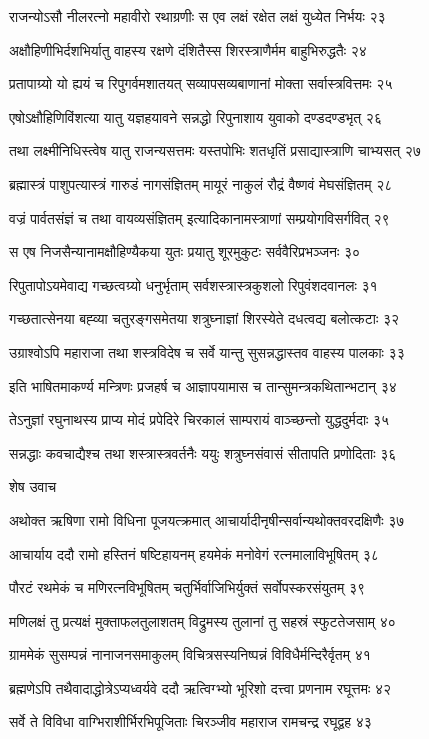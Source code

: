 राजन्योऽसौ नीलरत्नो महावीरो रथाग्रणीः
स एव लक्षं रक्षेत लक्षं युध्येत निर्भयः २३

अक्षौहिणीभिर्दशभिर्यातु वाहस्य रक्षणे
दंशितैस्स शिरस्त्राणैर्मम बाहुभिरुद्धतैः २४

प्रतापाग्र्यो यो ह्ययं च रिपुगर्वमशातयत्
सव्यापसव्यबाणानां मोक्ता सर्वास्त्रवित्तमः २५

एषोऽक्षौहिणिविंशत्या यातु यज्ञहयावने
सन्नद्धो रिपुनाशाय युवाको दण्डदण्डभृत् २६

तथा लक्ष्मीनिधिस्त्वेष यातु राजन्यसत्तमः
यस्तपोभिः शतधृतिं प्रसाद्यास्त्राणि चाभ्यसत् २७

ब्रह्मास्त्रं पाशुपत्यास्त्रं गारुडं नागसंज्ञितम्
मायूरं नाकुलं रौद्रं वैष्णवं मेघसंज्ञितम् २८

वज्रं पार्वतसंज्ञं च तथा वायव्यसंज्ञितम्
इत्यादिकानामस्त्राणां सम्प्रयोगविसर्गवित् २९

स एष निजसैन्यानामक्षौहिण्यैकया युतः
प्रयातु शूरमुकुटः सर्ववैरिप्रभञ्जनः ३०

रिपुतापोऽयमेवाद्य गच्छत्वग्र्यो धनुर्भृताम्
सर्वशस्त्रास्त्रकुशलो रिपुवंशदवानलः ३१

गच्छतात्सेनया बह्व्या चतुरङ्गसमेतया
शत्रुघ्नाज्ञां शिरस्येते दधत्वद्य बलोत्कटाः ३२

उग्राश्वोऽपि महाराजा तथा शस्त्रविदेष च
सर्वे यान्तु सुसन्नद्धास्तव वाहस्य पालकाः ३३

इति भाषितमाकर्ण्य मन्त्रिणः प्रजहर्ष च
आज्ञापयामास च तान्सुमन्त्रकथितान्भटान् ३४

तेऽनुज्ञां रघुनाथस्य प्राप्य मोदं प्रपेदिरे
चिरकालं साम्परायं वाञ्च्छन्तो युद्धदुर्मदाः ३५

सन्नद्धाः कवचाद्यैश्च तथा शस्त्रास्त्रवर्तनैः
ययुः शत्रुघ्नसंवासं सीतापति प्रणोदिताः ३६

शेष उवाच

अथोक्त ऋषिणा रामो विधिना पूजयत्क्रमात्
आचार्यादीनृषीन्सर्वान्यथोक्तवरदक्षिणैः ३७

आचार्याय ददौ रामो हस्तिनं षष्टिहायनम्
हयमेकं मनोवेगं रत्नमालाविभूषितम् ३८

पौरटं रथमेकं च मणिरत्नविभूषितम्
चतुर्भिर्वाजिभिर्युक्तं सर्वोपस्करसंयुतम् ३९

मणिलक्षं तु प्रत्यक्षं मुक्ताफलतुलाशतम्
विद्रुमस्य तुलानां तु सहस्रं स्फुटतेजसाम् ४०

ग्राममेकं सुसम्पन्नं नानाजनसमाकुलम्
विचित्रसस्यनिष्पन्नं विविधैर्मन्दिरैर्वृतम् ४१

ब्रह्मणेऽपि तथैवादाद्धोत्रेऽप्यध्वर्यवे ददौ
ऋत्विग्भ्यो भूरिशो दत्त्वा प्रणनाम रघूत्तमः ४२

सर्वे ते विविधा वाग्भिराशीर्भिरभिपूजिताः
चिरञ्जीव महाराज रामचन्द्र रघूद्वह ४३

